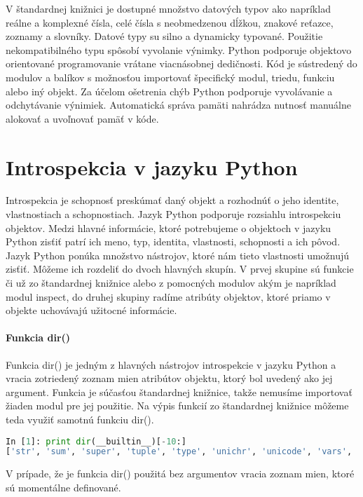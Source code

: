 \documentclass[11pt,oneside,final]{fithesis2}
\begin{document}
	V štandardnej knižnici je dostupné množstvo datových typov ako napríklad reálne a komplexné čísla, celé čísla s neobmedzenou dĺžkou, znakové reťazce, zoznamy a slovníky. Datové typy su silno a dynamicky typované. Použitie nekompatibilného typu spôsobí vyvolanie výnimky. Python podporuje objektovo orientované programovanie vrátane viacnásobnej dedičnosti. Kód je sústredený do modulov a balíkov s možnosťou importovať špecifický modul, triedu, funkciu alebo iný objekt. Za účelom ošetrenia chýb Python podporuje vyvolávanie a odchytávanie výnimiek. Automatická správa pamäti nahrádza nutnosť manuálne alokovať a uvoľnovať pamäť v kóde.


	\section{Introspekcia v jazyku Python}
		Introspekcia je schopnosť preskúmať daný objekt a rozhodnúť o jeho identite, vlastnostiach a schopnostiach. Jazyk Python podporuje rozsiahlu introspekciu objektov. Medzi hlavné informácie, ktoré potrebujeme o objektoch v jazyku Python zisťiť patrí ich meno, typ, identita, vlastnosti, schopnosti a ich pôvod. Jazyk Python ponúka množstvo nástrojov, ktoré nám tieto vlastnosti umožnujú zisťiť. Môžeme ich rozdeliť do dvoch hlavných skupín. V prvej skupine sú funkcie či už zo štandardnej knižnice alebo z pomocných modulov akým je napríklad modul inspect, do druhej skupiny radíme atribúty objektov, ktoré priamo v objekte uchovávajú užitocné informácie.

		\paragraph{Funkcia dir()}
			Funkcia dir() je jedným z hlavných nástrojov introspekcie v jazyku Python a vracia zotriedený zoznam mien atribútov objektu, ktorý bol uvedený ako jej argument. Funkcia je súčasťou štandardnej knižnice, takže nemusíme importovať žiaden modul pre jej použitie. Na výpis funkcií zo štandardnej knižnice môžeme teda využiť samotnú funkciu dir().
			

\begin{lstlisting}[language=python]
In [1]: print dir(__builtin__)[-10:]
['str', 'sum', 'super', 'tuple', 'type', 'unichr', 'unicode', 'vars', 'xrange', 'zip']
\end{lstlisting}

			 V prípade, že je funkcia dir() použitá bez argumentov vracia zoznam mien, ktoré sú momentálne definované.
\end{document}
